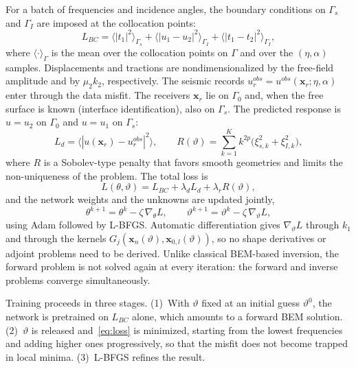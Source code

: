 For a batch of frequencies and incidence angles, the boundary conditions on
$\Gamma_s$ and $\Gamma_I$ are imposed at the collocation points:
\begin{equation}
  L_{BC} = \bigl\langle |t_1|^2 \bigr\rangle_{\Gamma_s}
  + \bigl\langle |u_1-u_2|^2 \bigr\rangle_{\Gamma_I}
  + \bigl\langle |t_1-t_2|^2 \bigr\rangle_{\Gamma_I},
\end{equation}
where $\langle\cdot\rangle_{\Gamma}$ is the mean over the collocation points on
$\Gamma$ and over the $(\eta,\alpha)$ samples. Displacements and tractions are
nondimensionalized by the free-field amplitude and by $\mu_2 k_2$, respectively.
The seismic records $u^{obs}_r = u^{obs}(\mathbf{x}_r;\eta,\alpha)$ enter
through the data misfit. The receivers $\mathbf{x}_r$ lie on $\Gamma_0$ and, when
the free surface is known (interface identification), also on $\Gamma_s$. The
predicted response is $u = u_2$ on $\Gamma_0$ and $u = u_1$ on $\Gamma_s$:
\begin{equation}
  L_d = \bigl\langle |u(\mathbf{x}_r) - u^{obs}_r|^2 \bigr\rangle,
  \qquad
  R(\vartheta) = \sum_{k=1}^{K} k^{2p}\bigl(\xi_{s,k}^2 + \xi_{I,k}^2\bigr),
\end{equation}
where $R$ is a Sobolev-type penalty that favors smooth geometries and limits the
non-uniqueness of the problem. The total loss is
\begin{equation}\label{eq:loss}
  L(\theta,\vartheta) = L_{BC} + \lambda_d L_d + \lambda_r R(\vartheta),
\end{equation}
and the network weights and the unknowns are updated jointly,
\begin{equation}
  \theta^{k+1} = \theta^k - \zeta\,\nabla_\theta L, \qquad
  \vartheta^{k+1} = \vartheta^k - \zeta\,\nabla_\vartheta L,
\end{equation}
using Adam followed by L-BFGS. Automatic differentiation gives
$\nabla_\vartheta L$ through $k_1$ and through the kernels
$G_j(\mathbf{x}_n(\vartheta),\mathbf{x}_{0,l}(\vartheta))$, so no shape
derivatives or adjoint problems need to be derived. Unlike classical
BEM-based inversion, the forward problem is not solved again at every iteration:
the forward and inverse problems converge simultaneously.

Training proceeds in three stages. (1)~With $\vartheta$ fixed at an initial
guess $\vartheta^0$, the network is pretrained on $L_{BC}$ alone, which amounts
to a forward BEM solution. (2)~$\vartheta$ is released and~\eqref{eq:loss} is
minimized, starting from the lowest frequencies and adding higher ones
progressively, so that the misfit does not become trapped in local minima.
(3)~L-BFGS refines the result.

